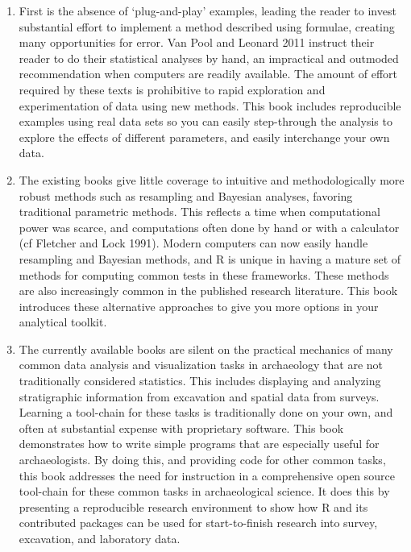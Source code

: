 \documentclass[]{book}
\begin{document}
\begin{enumerate}
\def\labelenumi{\arabic{enumi}.}
\item
  First is the absence of `plug-and-play' examples, leading the reader
  to invest substantial effort to implement a method described using
  formulae, creating many opportunities for error. Van Pool and Leonard
  2011 instruct their reader to do their statistical analyses by hand,
  an impractical and outmoded recommendation when computers are readily
  available. The amount of effort required by these texts is prohibitive
  to rapid exploration and experimentation of data using new methods.
  This book includes reproducible examples using real data sets so you
  can easily step-through the analysis to explore the effects of
  different parameters, and easily interchange your own data.
\item
  The existing books give little coverage to intuitive and
  methodologically more robust methods such as resampling and Bayesian
  analyses, favoring traditional parametric methods. This reflects a
  time when computational power was scarce, and computations often done
  by hand or with a calculator (cf Fletcher and Lock 1991). Modern
  computers can now easily handle resampling and Bayesian methods, and R
  is unique in having a mature set of methods for computing common tests
  in these frameworks. These methods are also increasingly common in the
  published research literature. This book introduces these alternative
  approaches to give you more options in your analytical toolkit.
\item
  The currently available books are silent on the practical mechanics of
  many common data analysis and visualization tasks in archaeology that
  are not traditionally considered statistics. This includes displaying
  and analyzing stratigraphic information from excavation and spatial
  data from surveys. Learning a tool-chain for these tasks is
  traditionally done on your own, and often at substantial expense with
  proprietary software. This book demonstrates how to write simple
  programs that are especially useful for archaeologists. By doing this,
  and providing code for other common tasks, this book addresses the
  need for instruction in a comprehensive open source tool-chain for
  these common tasks in archaeological science. It does this by
  presenting a reproducible research environment to show how R and its
  contributed packages can be used for start-to-finish research into
  survey, excavation, and laboratory data.
\end{enumerate}
\end{document}
